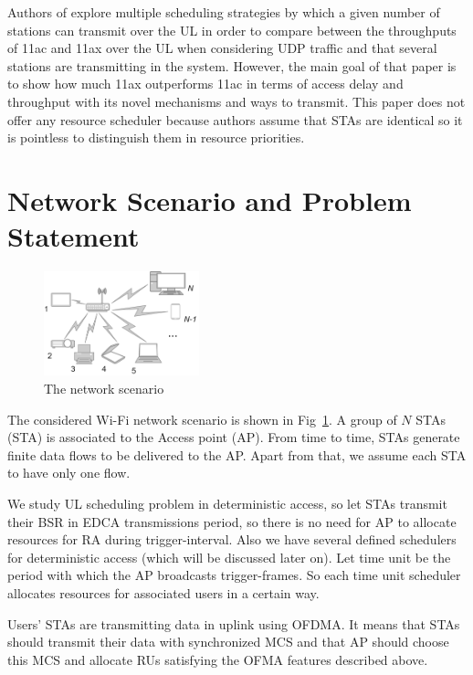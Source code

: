 Authors of \cite{sharon2017scheduling} explore multiple scheduling strategies by which a given number of stations can transmit over the UL in order to compare between the throughputs of 11ac and 11ax over the UL when considering UDP traffic and that several stations are transmitting in the system. However, the main goal of that paper is to show how much 11ax outperforms 11ac in terms of access delay and throughput with its novel mechanisms and ways to transmit. This paper does not offer any resource scheduler because authors assume that STAs are identical so it is pointless to distinguish them in resource priorities.  

\section{Network Scenario and Problem Statement}
\label{sec:scenario}

\begin{figure}[t]
	\includegraphics[width = 0.4\textwidth]{NetworkScenario}
	\caption{\label{fig:scenario} The network scenario}
\end{figure}

The considered Wi-Fi network scenario is shown in Fig~\ref{fig:scenario}. A group of $N$ STAs (STA) is associated to the Access point (AP). 
From time to time, STAs generate finite data flows to be delivered to the AP. Apart from that, we assume each STA to have only one flow.

We study UL scheduling problem in deterministic access, so let STAs transmit their BSR in EDCA transmissions period, so there is no need for AP to allocate resources for RA during trigger-interval.
Also we have several defined schedulers for deterministic access (which will be discussed later on). 
Let time unit be the period with which the AP broadcasts trigger-frames.
So each time unit scheduler allocates resources for associated users in a certain way.

Users' STAs are transmitting data in uplink using OFDMA. 
It means that STAs should transmit their data with synchronized MCS and that AP should choose this MCS and allocate RUs satisfying the OFMA features described above. 

